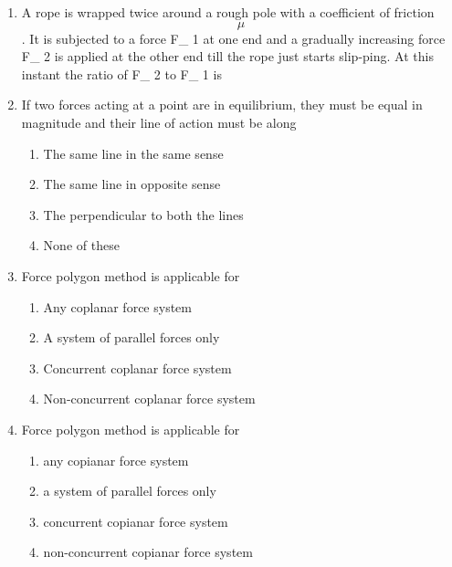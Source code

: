 \documentclass[11pt,a4paper]{article}
\begin{document}
\begin{enumerate}
\item{A rope is wrapped twice around a rough pole with a coefficient of friction $$\mu $$ . It is subjected to a force F\_ 1 at one end and a gradually increasing force F\_ 2 is applied at the other end till the rope just starts slip-ping. At this instant the ratio of F\_ 2 to F\_ 1 is
}
\\
\item{If two forces acting at a point are in equilibrium, they must be equal in magnitude and their line of action must be along}
\begin{enumerate}[label=\Alph*.]
\item{The same line in the same sense}
\item{The same line in opposite sense}
\item{The perpendicular to both the lines}
\item{None of these}
\end{enumerate}
\item{Force polygon method is applicable for}
\begin{enumerate}[label=\Alph*.]
\item{Any coplanar force system}
\item{A system of parallel forces only}
\item{Concurrent coplanar force system}
\item{Non-concurrent coplanar force system}
\end{enumerate}
\item{Force polygon method is applicable for}
\begin{enumerate}[label=\Alph*.]
\item{any copianar force system}
\item{a system of parallel forces only}
\item{concurrent copianar force system}
\item{non-concurrent copianar force system}

\end{enumerate}
\end{enumerate}
\end{document}
